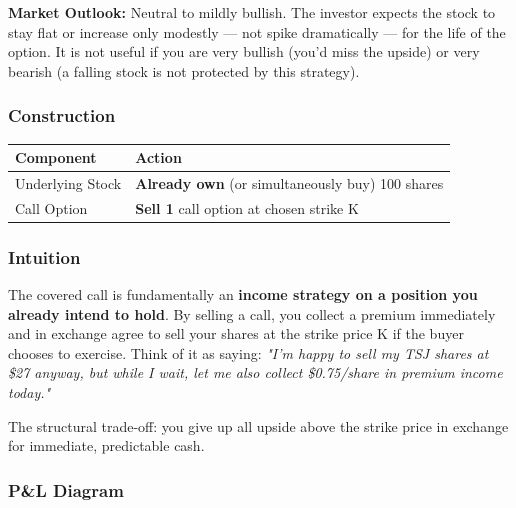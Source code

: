 \documentclass[12pt,openany]{book}
\begin{document}
\textbf{Market Outlook:} Neutral to mildly bullish. The investor expects the stock to stay flat or increase only modestly — not spike dramatically — for the life of the option. It is not useful if you are very bullish (you'd miss the upside) or very bearish (a falling stock is not protected by this strategy).



\subsubsection{Construction}

\begin{center}
\scriptsize
\setlength{\tabcolsep}{3pt}
\begin{tabular}{|L{6.00cm}|L{6.00cm}|}
\hline
Component & Action \\
\hline
Underlying Stock & \textbf{Already own} (or simultaneously buy) 100 shares \\
\hline
Call Option & \textbf{Sell 1} call option at chosen strike K \\
\hline
\end{tabular}
\end{center}



\subsubsection{Intuition}

The covered call is fundamentally an \textbf{income strategy on a position you already intend to hold}. By selling a call, you collect a premium immediately and in exchange agree to sell your shares at the strike price K if the buyer chooses to exercise. Think of it as saying: \emph{"I'm happy to sell my TSJ shares at \$27 anyway, but while I wait, let me also collect \$0.75/share in premium income today."}

The structural trade-off: you give up all upside above the strike price in exchange for immediate, predictable cash.



\subsubsection{P\&L Diagram}
\end{document}
